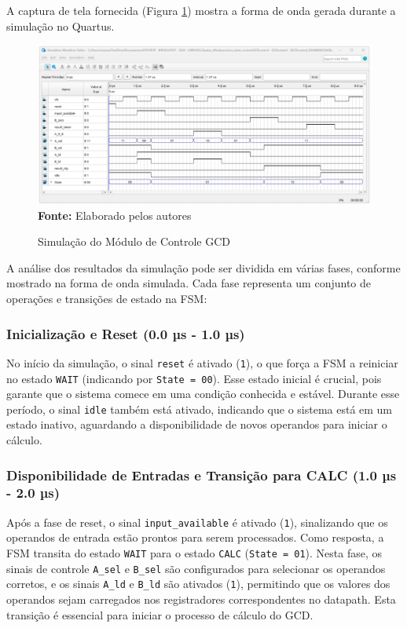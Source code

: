 \documentclass[a4paper,11pt]{article} %
\begin{document}
A captura de tela fornecida (Figura \ref{simulacao_gcd}) mostra a forma de onda gerada durante a simulação no Quartus.

\begin{figure}[ht]
    \centering
    \caption{Simulação do Módulo de Controle GCD}
    \includegraphics[width=15cm,angle=0]{imgs/simulacao_gcd_quartus.png}
    \\\textbf{Fonte:} Elaborado pelos autores
    \label{simulacao_gcd}
\end{figure}

A análise dos resultados da simulação pode ser dividida em várias fases, conforme mostrado na forma de onda simulada. Cada fase representa um conjunto de operações e transições de estado na FSM:

\subsubsection{Inicialização e Reset (0.0 µs - 1.0 µs)}

No início da simulação, o sinal \texttt{reset} é ativado (\texttt{1}), o que força a FSM a reiniciar no estado \texttt{WAIT} (indicando por \texttt{State = 00}). Esse estado inicial é crucial, pois garante que o sistema comece em uma condição conhecida e estável. Durante esse período, o sinal \texttt{idle} também está ativado, indicando que o sistema está em um estado inativo, aguardando a disponibilidade de novos operandos para iniciar o cálculo.

\subsubsection{Disponibilidade de Entradas e Transição para CALC (1.0 µs - 2.0 µs)}

Após a fase de reset, o sinal \texttt{input\_available} é ativado (\texttt{1}), sinalizando que os operandos de entrada estão prontos para serem processados. Como resposta, a FSM transita do estado \texttt{WAIT} para o estado \texttt{CALC} (\texttt{State = 01}). Nesta fase, os sinais de controle \texttt{A\_sel} e \texttt{B\_sel} são configurados para selecionar os operandos corretos, e os sinais \texttt{A\_ld} e \texttt{B\_ld} são ativados (\texttt{1}), permitindo que os valores dos operandos sejam carregados nos registradores correspondentes no datapath. Esta transição é essencial para iniciar o processo de cálculo do GCD.
\end{document}

